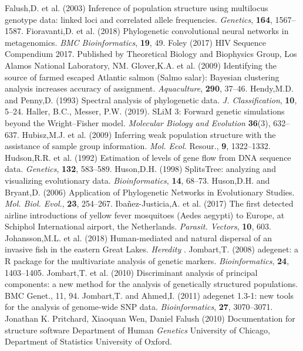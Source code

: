 \documentclass[final]{bioinfo}
\begin{document}
\begin{thebibliography}{}
\bibitem[a ()]{}Falush,D. et al. (2003) Inference of population structure using multilocus genotype data: linked loci and correlated allele frequencies. \textit{Genetics}, \textbf{164}, 1567–1587.
\bibitem[a ()]{}Fioravanti,D. et al. (2018) Phylogenetic convolutional neural networks in metagenomics. \textit{BMC Bioinformatics}, \textbf{19}, 49.
\bibitem[a ()]{}Foley (2017) HIV Sequence Compendium 2017. Published by Theoretical Biology and Biophysics Group, Los Alamos National Laboratory, NM.
\bibitem[a ()]{}Glover,K.A. et al. (2009) Identifying the source of farmed escaped Atlantic salmon (Salmo salar): Bayesian clustering analysis increases accuracy of assignment. \textit{Aquaculture}, \textbf{290}, 37–46.
\bibitem[a ()]{}Hendy,M.D. and Penny,D. (1993) Spectral analysis of phylogenetic data. \textit{J. Classification}, \textbf{10}, 5–24.
\bibitem[a ()]{}Haller, B.C., Messer, P.W. (2019). SLiM 3: Forward genetic simulations beyond the Wright–Fisher model. \textit{Molecular Biology and Evolution} \textbf{36}(3), 632–637. 
\bibitem[a ()]{}Hubisz,M.J. et al. (2009) Inferring weak population structure with the assistance of sample group information. \textit{Mol. Ecol.} Resour., \textbf{9}, 1322–1332.
\bibitem[a ()]{}Hudson,R.R. et al. (1992) Estimation of levels of gene flow from DNA sequence data. \textit{Genetics}, \textbf{132}, 583–589.
\bibitem[a ()]{}Huson,D.H. (1998) SplitsTree: analyzing and visualizing evolutionary data. \textit{Bioinformatics}, \textbf{14}, 68–73.
\bibitem[a ()]{}Huson,D.H. and Bryant,D. (2006) Application of Phylogenetic Networks in Evolutionary Studies. \textit{Mol. Biol. Evol.}, \textbf{23}, 254–267.
\bibitem[a ()]{}Ibañez-Justicia,A. et al. (2017) The first detected airline introductions of yellow fever mosquitoes (Aedes aegypti) to Europe, at Schiphol International airport, the Netherlands. \textit{Parasit. Vectors}, \textbf{10}, 603.
\bibitem[a ()]{}Johansson,M.L. et al. (2018) Human-mediated and natural dispersal of an invasive fish in the eastern Great Lakes. \textit{Heredity }.
\bibitem[a ()]{}Jombart,T. (2008) adegenet: a R package for the multivariate analysis of genetic markers. \textit{Bioinformatics}, \textbf{24}, 1403–1405.
\bibitem[a ()]{}Jombart,T. et al. (2010) Discriminant analysis of principal components: a new method for the analysis of genetically structured populations. BMC Genet., 11, 94.
\bibitem[a ()]{}Jombart,T. and Ahmed,I. (2011) adegenet 1.3-1: new tools for the analysis of genome-wide SNP data. \textit{Bioinformatics}, \textbf{27}, 3070–3071.
\bibitem[a ()]{}Jonathan K. Pritchard, Xiaoquan Wen, Daniel Falush (2010) Documentation for structure software Department of Human \textit{Genetics} University of Chicago, Department of Statistics University of Oxford.

\end{thebibliography}
\end{document}
